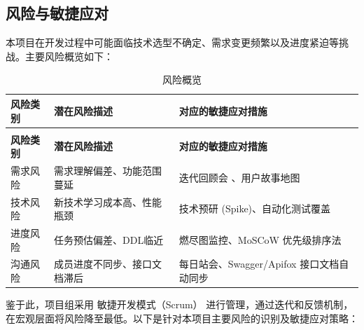 \subsection{风险与敏捷应对}

本项目在开发过程中可能面临技术选型不确定、需求变更频繁以及进度紧迫等挑战。主要风险概览如下：

\begin{longtable}{>{\centering\arraybackslash}m{2cm} >{\centering\arraybackslash}m{6cm} >{\centering\arraybackslash}m{6cm}}

    \caption{风险概览} \label{tab:training}                            \\

    \toprule
    \textbf{风险类别} & \textbf{潜在风险描述} & \textbf{对应的敏捷应对措施 }          \\
    \midrule
    \endfirsthead

    \multicolumn{3}{c}{{\tablename\ \thetable{} 续表}}               \\
    \toprule
    \textbf{风险类别} & \textbf{潜在风险描述} & \textbf{对应的敏捷应对措施 }          \\
    \midrule
    \endhead

    \bottomrule
    \endfoot

    需求风险          & 需求理解偏差、功能范围蔓延   & 迭代回顾会 、用户故事地图                \\
    技术风险          & 新技术学习成本高、性能瓶颈   & 技术预研 (Spike)、自动化测试覆盖         \\
    进度风险          & 任务预估偏差、DDL临近    & 燃尽图监控、MoSCoW 优先级排序法          \\
    沟通风险          & 成员进度不同步、接口文档滞后  & 每日站会、Swagger/Apifox 接口文档自动同步 \\
\end{longtable}

鉴于此，项目组采用 敏捷开发模式（Scrum） 进行管理，通过迭代和反馈机制，在宏观层面将风险降至最低。以下是针对本项目主要风险的识别及敏捷应对策略：

